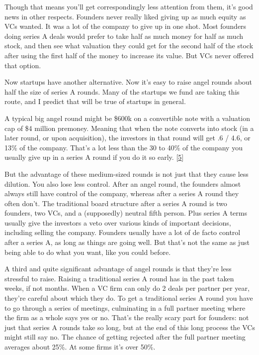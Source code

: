 Though that means you'll get correspondingly less attention from them,
it's good news in other respects. Founders never really liked giving up
as much equity as VCs wanted. It was a lot of the company to give up in
one shot. Most founders doing series A deals would prefer to take half
as much money for half as much stock, and then see what valuation they
could get for the second half of the stock after using the first half of
the money to increase its value. But VCs never offered that option.

Now startups have another alternative. Now it's easy to raise angel
rounds about half the size of series A rounds. Many of the startups we
fund are taking this route, and I predict that will be true of startups
in general.

A typical big angel round might be \$600k on a convertible note with a
valuation cap of \$4 million premoney. Meaning that when the note
converts into stock (in a later round, or upon acquisition), the
investors in that round will get .6 / 4.6, or 13\% of the company.
That's a lot less than the 30 to 40\% of the company you usually give up
in a series A round if you do it so early. {[}\hyperref[f5n]{5}{]}

But the advantage of these medium-sized rounds is not just that they
cause less dilution. You also lose less control. After an angel round,
the founders almost always still have control of the company, whereas
after a series A round they often don't. The traditional board structure
after a series A round is two founders, two VCs, and a (supposedly)
neutral fifth person. Plus series A terms usually give the investors a
veto over various kinds of important decisions, including selling the
company. Founders usually have a lot of de facto control after a series
A, as long as things are going well. But that's not the same as just
being able to do what you want, like you could before.

A third and quite significant advantage of angel rounds is that they're
less stressful to raise. Raising a traditional series A round has in the
past taken weeks, if not months. When a VC firm can only do 2 deals per
partner per year, they're careful about which they do. To get a
traditional series A round you have to go through a series of meetings,
culminating in a full partner meeting where the firm as a whole says yes
or no. That's the really scary part for founders: not just that series A
rounds take so long, but at the end of this long process the VCs might
still say no. The chance of getting rejected after the full partner
meeting averages about 25\%. At some firms it's over 50\%.

